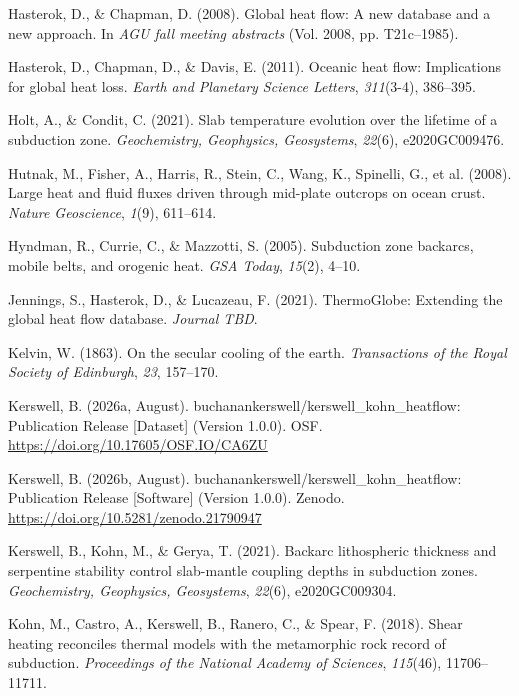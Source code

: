 \documentclass[draft,linenumbers]{agujournal2019}
\newlength{\cslhangindent}
\newenvironment{CSLReferences}[2]
 {\begin{list}{}{
  \setlength{\itemindent}{0pt}
  \setlength{\leftmargin}{0pt}
  \setlength{\parsep}{0pt}
  \ifodd #1
   \setlength{\leftmargin}{\cslhangindent}
   \setlength{\itemindent}{-\cslhangindent}
  \fi
  \setlength{\itemsep}{#2\baselineskip}
  }
  \item\relax}
 {\end{list}}
\begin{document}
\begin{CSLReferences}{1}{0}
Hasterok, D., \& Chapman, D. (2008). Global heat flow: A new database
and a new approach. In \emph{AGU fall meeting abstracts} (Vol. 2008, pp.
T21c--1985).

Hasterok, D., Chapman, D., \& Davis, E. (2011). Oceanic heat flow:
Implications for global heat loss. \emph{Earth and Planetary Science
Letters}, \emph{311}(3-4), 386--395.

Holt, A., \& Condit, C. (2021). Slab temperature evolution over the
lifetime of a subduction zone. \emph{Geochemistry, Geophysics,
Geosystems}, \emph{22}(6), e2020GC009476.

Hutnak, M., Fisher, A., Harris, R., Stein, C., Wang, K., Spinelli, G.,
et al. (2008). Large heat and fluid fluxes driven through mid-plate
outcrops on ocean crust. \emph{Nature Geoscience}, \emph{1}(9),
611--614.

Hyndman, R., Currie, C., \& Mazzotti, S. (2005). Subduction zone
backarcs, mobile belts, and orogenic heat. \emph{GSA Today},
\emph{15}(2), 4--10.

Jennings, S., Hasterok, D., \& Lucazeau, F. (2021). ThermoGlobe:
Extending the global heat flow database. \emph{Journal TBD}.

Kelvin, W. (1863). On the secular cooling of the earth.
\emph{Transactions of the Royal Society of Edinburgh}, \emph{23},
157--170.

Kerswell, B. (2026a, August).
{buchanankerswell/kerswell\_kohn\_heatflow: Publication Release
{[}Dataset{]}} (Version 1.0.0). OSF.
\url{https://doi.org/10.17605/OSF.IO/CA6ZU}

Kerswell, B. (2026b, August).
{buchanankerswell/kerswell\_kohn\_heatflow: Publication Release
{[}Software{]}} (Version 1.0.0). Zenodo.
\url{https://doi.org/10.5281/zenodo.21790947}

Kerswell, B., Kohn, M., \& Gerya, T. (2021). Backarc lithospheric
thickness and serpentine stability control slab-mantle coupling depths
in subduction zones. \emph{Geochemistry, Geophysics, Geosystems},
\emph{22}(6), e2020GC009304.

Kohn, M., Castro, A., Kerswell, B., Ranero, C., \& Spear, F. (2018).
Shear heating reconciles thermal models with the metamorphic rock record
of subduction. \emph{Proceedings of the National Academy of Sciences},
\emph{115}(46), 11706--11711.


\end{CSLReferences}
\end{document}
